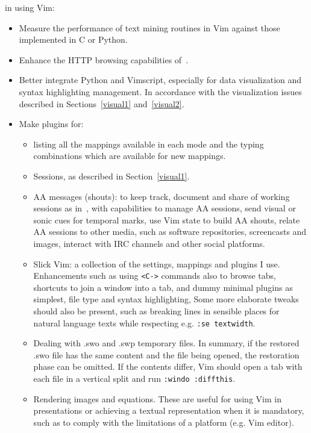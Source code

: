 \documentclass{article}
\newcommand{\ttt}[1] {
	\texttt{<#1>}}
\newcommand{\tttt}[1]{\texttt{#1}}
\begin{document}
 in using Vim:
\begin{itemize}
  \item Measure the performance of text mining routines in Vim against those implemented in C or Python.
  \item Enhance the HTTP browsing capabilities of~\cite{vimrc}.
  \item Better integrate Python and Vimscript, especially for data visualization
    and syntax highlighting management.
    In accordance with the visualization issues described in
    Sections~\ref{visual1} and~\ref{visual2}.
  \item Make plugins for:
    \begin{itemize}
      \item listing all the mappings available in each mode and the typing combinations which are available
        for new mappings.
      \item Sessions, as described in Section~\ref{visual1}.
      \item AA messages (shouts): to keep track, document and share of working sessions
        as in~\cite{aa1,aa2}, with capabilities to manage AA sessions,
        send visual or sonic cues for temporal marks, use Vim state to build AA shouts,
        relate AA sessions to other media, such as software repositories,
        screencasts and images, interact with IRC channels and other social platforms.
      \item Slick Vim: a collection of the settings, mappings and plugins I use.
        Enhancements such as using \ttt{C-} commands also to browse tabs,
        shortcuts to join a window into a tab,
        and dummy minimal plugins as simplest, file type and syntax highlighting,
        Some more elaborate tweaks should also be present, such
        as breaking lines in sensible places for natural language texts
        while respecting e.g. \tttt{:se textwidth}.
      \item Dealing with .swo and .swp temporary files.
        In summary, if the restored .swo file has the same content
        and the file being opened,
        the restoration phase can be omitted.
        If the contents differ, Vim should open a tab with each file
        in a vertical split and run \tttt{:windo :diffthis}.
      \item Rendering images and equations.
        These are useful for using Vim in presentations
        or achieving a textual representation when it is mandatory,
        such as to comply with the limitations of a platform (e.g. Vim editor). 

\end{itemize}
\end{itemize}
\end{document}
